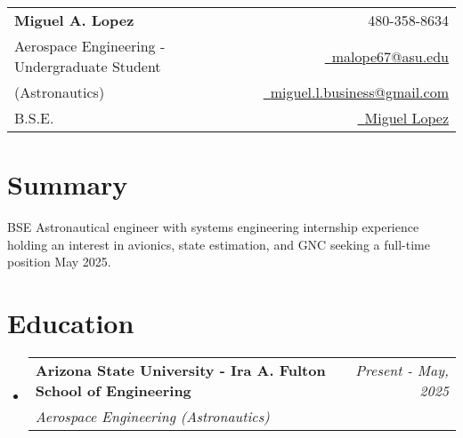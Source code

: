 \documentclass[a4paper,11pt]{article}
\makeatletter
\newcommand{\resumeSubheading}[4]{
	\vspace{0.5mm}\item
	\begin{tabular*}{0.98\textwidth}[t]{l@{\extracolsep{\fill}}r}
		\textbf{#1} & \textit{\footnotesize{#4}} \\
		\textit{\footnotesize{#3}} &  \footnotesize{#2}\\
	\end{tabular*}
	\vspace{-2.4mm}
}
\newcommand{\resumeSubHeadingListStart}{\begin{itemize}[leftmargin=*,labelsep=0mm]}
\newcommand{\resumeSubHeadingListEnd}{\end{itemize}\vspace{2mm}}
\newcommand{\name}{\Huge{Miguel A. Lopez}} %
\newcommand{\course}{Aerospace Engineering - Undergraduate Student} %
\newcommand{\roll}{1213861270} %
\newcommand{\phone}{480-358-8634} %
\newcommand{\emaila}{malope67@asu.edu} %
\newcommand{\emailb}{miguel.l.business@gmail.com} %
\makeatother
\begin{document}
	\selectfont
	
	
	\parbox{2.35cm}{%
	}
	\parbox{\dimexpr\linewidth-0.0cm\relax}{
		\begin{tabularx}{\linewidth}{L r} \\
			\textbf{\Large \name} & {\raisebox{0.0\height}{\footnotesize \faPhone}\ \phone}\\
			\course & \href{mailto:\emaila}{\raisebox{0.0\height}{\footnotesize \faEnvelope}\ {\emaila}}\\
			{(Astronautics)} &  \href{mailto:\emailb}{\raisebox{0.0\height}{\footnotesize \faEnvelope}\ {\emailb}}\\
			{B.S.E.} & \href{www.linkedin.com/in/miguel-lopez-242628a2}{\raisebox{0.0\height}{\footnotesize \faLinkedin}\ {Miguel Lopez}}
		\end{tabularx}
	}
	
	\section{\textbf{Summary}}
	\begin{itemize}[leftmargin=0.05in, label={}]
		\small{\item{
				\textbf{}{BSE Astronautical engineer with systems engineering internship experience holding an interest in avionics, state estimation, and GNC seeking a full-time position May 2025.} \\
		}}
	\end{itemize}
	\vspace{-7.5mm}
	
	
	\section{\textbf{Education}}
	\resumeSubHeadingListStart
	\resumeSubheading
	{Arizona State University - Ira A. Fulton School of Engineering}{	}
	{Aerospace Engineering (Astronautics)}{Present - May, 2025}
	\resumeSubHeadingListEnd
	\vspace{-7.5mm}
	
\end{document}
